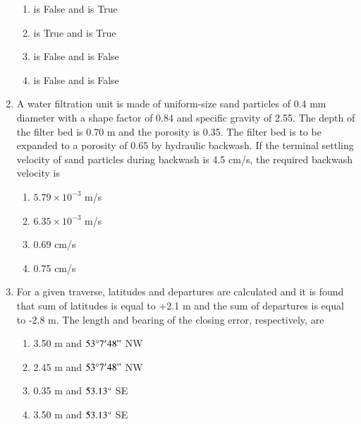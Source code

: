 \documentclass[journal,12pt,onecolumn]{article}
\theoremstyle{remark}
\begin{document}
\begin{enumerate}
\hfill{}

\begin{enumerate}
    \item {} is False and  is True
    \item {} is True and  is True
    \item {} is False and  is False
    \item {} is False and  is False
\end{enumerate}

\item A water filtration unit is made of uniform-size sand particles of 0.4 mm diameter with a shape factor of 0.84 and specific gravity of 2.55. The depth of the filter bed is 0.70 m and the porosity is 0.35. The filter bed is to be expanded to a porosity of 0.65 by hydraulic backwash. If the terminal settling velocity of sand particles during backwash is 4.5 cm/s, the required backwash velocity is

\hfill{}

\begin{multicols}{2}
\begin{enumerate}
    \item $5.79 \times 10^{-3}$ m/s
    \item $6.35 \times 10^{-3}$ m/s
    \item 0.69 cm/s
    \item 0.75 cm/s
\end{enumerate}
\end{multicols}

\item For a given traverse, latitudes and departures are calculated and it is found that sum of latitudes is equal to +2.1 m and the sum of departures is equal to -2.8 m. The length and bearing of the closing error, respectively, are

\hfill{}

\begin{multicols}{2}
\begin{enumerate}
    \item 3.50 m and $53\degree7'48"$ NW
    \item 2.45 m and $53\degree7'48"$ NW
    \item 0.35 m and $53.13\degree$ SE
    \item 3.50 m and $53.13\degree$ SE
\end{enumerate}
\end{multicols}


\end{enumerate}
\end{document}
